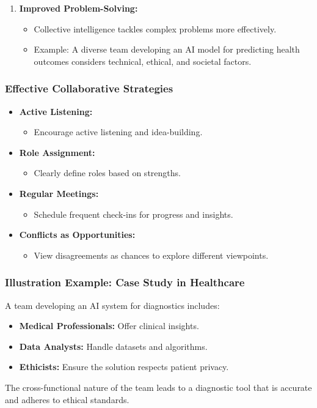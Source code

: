 \documentclass{beamer}
\begin{document}
\begin{frame}[fragile]
\begin{enumerate}
        \item \textbf{Improved Problem-Solving:}
            \begin{itemize}
                \item Collective intelligence tackles complex problems more effectively.
                \item Example: A diverse team developing an AI model for predicting health outcomes considers technical, ethical, and societal factors.
            \end{itemize}
    \end{enumerate}
\end{frame}

\begin{frame}[fragile]
    \frametitle{Effective Collaborative Strategies}
    \begin{itemize}
        \item \textbf{Active Listening:}
            \begin{itemize}
                \item Encourage active listening and idea-building.
            \end{itemize}

        \item \textbf{Role Assignment:}
            \begin{itemize}
                \item Clearly define roles based on strengths.
            \end{itemize}

        \item \textbf{Regular Meetings:}
            \begin{itemize}
                \item Schedule frequent check-ins for progress and insights.
            \end{itemize}

        \item \textbf{Conflicts as Opportunities:}
            \begin{itemize}
                \item View disagreements as chances to explore different viewpoints.
            \end{itemize}
    \end{itemize}
\end{frame}

\begin{frame}[fragile]
    \frametitle{Illustration Example: Case Study in Healthcare}
    A team developing an AI system for diagnostics includes:
    \begin{itemize}
        \item \textbf{Medical Professionals:} Offer clinical insights.
        \item \textbf{Data Analysts:} Handle datasets and algorithms.
        \item \textbf{Ethicists:} Ensure the solution respects patient privacy.
    \end{itemize}
    The cross-functional nature of the team leads to a diagnostic tool that is accurate and adheres to ethical standards.
\end{frame}
\end{document}

